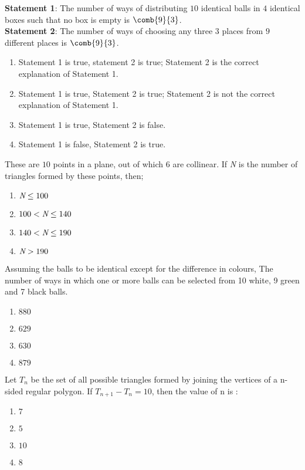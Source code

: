\item \textbf{Statement 1}: The number of ways of distributing $10$ identical balls in $4$ identical boxes such that no box is empty is $\comb{9}{3}$.\\\textbf{Statement 2}: The number of ways of choosing any three $3$ places from $9$ different places is $\comb{9}{3}$. \hfill{}
 \begin{enumerate}
     \item Statement 1 is true, statement 2 is true; Statement 2 is the correct explanation of Statement 1.
     \item Statement 1 is true, Statement 2 is true; Statement 2 is not the correct explanation of Statement 1.
     \item Statement 1 is true, Statement 2 is false.
     \item Statement 1 is false, Statement 2 is true.
 \end{enumerate}
\item These are $10$ points in a plane, out of which 6 are collinear. If \emph{N} is the number of triangles formed by these points, then; \hfill{}
	\begin{multicols}{2}
	\begin{enumerate}
		\item $ \emph{N} \le100$
		\item $100< \emph{N} \le140$
		\item $140< \emph{N} \le190$
		\item $ \emph{N} >190$
        \end{enumerate}
	\end{multicols}
\item Assuming the balls to be identical except for the difference in colours, The number of ways in which one or more balls can be selected from 10 white, 9 green and 7 black balls. \hfill {}
	\begin{multicols}{4}
	\begin{enumerate}
     \item $880$
     \item $629$
     \item $630$
     \item $879$
        \end{enumerate}
	\end{multicols}
\item Let $T_n$ be the set of all possible triangles formed by joining the vertices of a n-sided regular polygon. If $T_{n+1} - T_n = 10$, then the value of n is : \hfill {}
	\begin{multicols}{4}
	\begin{enumerate}
     \item $7$
     \item $5$
     \item $10$
     \item $8$
        \end{enumerate}
	\end{multicols}
